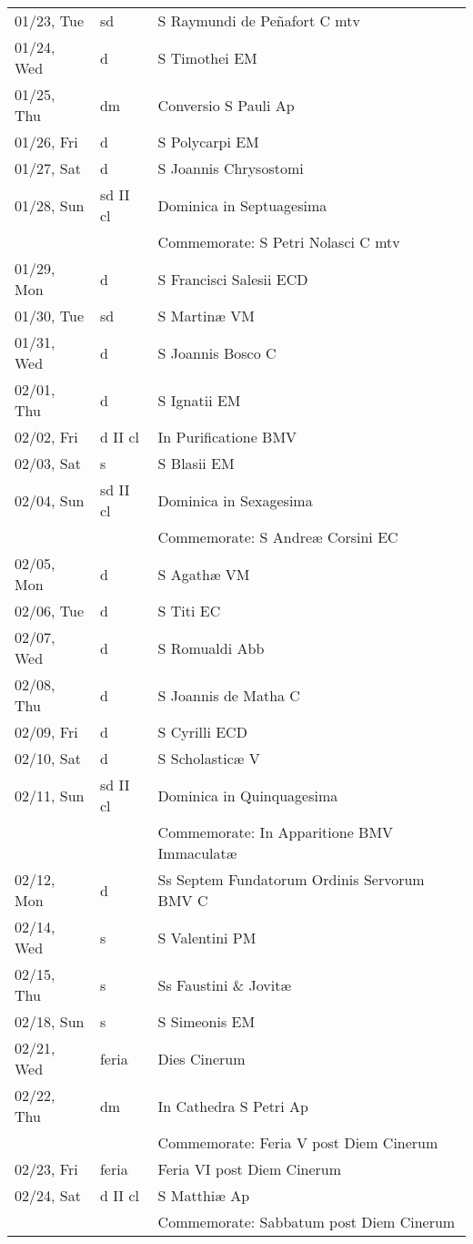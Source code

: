 \documentclass{article}
\begin{document}
\begin{longtable}{ l l l }
01/23, Tue & sd & S Raymundi de Peñafort C mtv\\
01/24, Wed & d & S Timothei EM\\
01/25, Thu & dm & Conversio S Pauli Ap\\
01/26, Fri & d & S Polycarpi EM\\
01/27, Sat & d & S Joannis Chrysostomi\\
01/28, Sun & sd II cl & Dominica in Septuagesima\\
 & & Commemorate: S Petri Nolasci C mtv\\
01/29, Mon & d & S Francisci Salesii ECD\\
01/30, Tue & sd & S Martinæ VM\\
01/31, Wed & d & S Joannis Bosco C\\
02/01, Thu & d & S Ignatii EM\\
02/02, Fri & d II cl & In Purificatione BMV\\
02/03, Sat & s & S Blasii EM\\
02/04, Sun & sd II cl & Dominica in Sexagesima\\
 & & Commemorate: S Andreæ Corsini EC\\
02/05, Mon & d & S Agathæ VM\\
02/06, Tue & d & S Titi EC\\
02/07, Wed & d & S Romualdi Abb\\
02/08, Thu & d & S Joannis de Matha C\\
02/09, Fri & d & S Cyrilli ECD\\
02/10, Sat & d & S Scholasticæ V\\
02/11, Sun & sd II cl & Dominica in Quinquagesima\\
 & & Commemorate: In Apparitione BMV Immaculatæ\\
02/12, Mon & d & Ss Septem Fundatorum Ordinis Servorum BMV C\\
02/14, Wed & s & S Valentini PM\\
02/15, Thu & s & Ss Faustini \& Jovitæ\\
02/18, Sun & s & S Simeonis EM\\
02/21, Wed & feria & Dies Cinerum\\
02/22, Thu & dm & In Cathedra S Petri Ap\\
 & & Commemorate: Feria V post Diem Cinerum\\
02/23, Fri & feria & Feria VI post Diem Cinerum\\
02/24, Sat & d II cl & S Matthiæ Ap\\
 & & Commemorate: Sabbatum post Diem Cinerum\\

\end{longtable}
\end{document}
